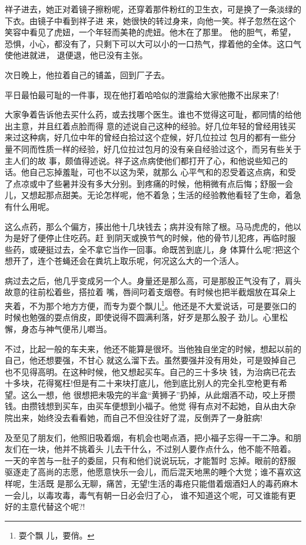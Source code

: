 \documentclass[11pt,a4paper,onecolumn]{article}
\begin{document}
祥子进去，她正对着镜子擦粉呢，还穿着那件粉红的卫生衣，可是换了一条淡绿的下衣。由镜子中看到祥子进
来，她很快的转过身来，向他一笑。祥子忽然在这个笑容中看见了虎妞，一个年轻而美艳的虎妞。他木在了那里。
他的胆气，希望，恐惧，小心，都没有了，只剩下可以大可以小的一口热气，撑着他的全体。这口气使他进就进，
退便退，他已没有主张。

次日晚上，他拉着自己的铺盖，回到厂子去。

平日最怕最可耻的一件事，现在他打着哈哈似的泄露给大家\myrule 他撒不出尿来了!

大家争着告诉他去买什么药，或去找哪个医生。谁也不觉得这可耻，都同情的给他出主意，并且红着点脸而得
意的述说自己这种的经验。好几位年轻的曾经用钱买来过这种病，好几位中年的曾经白拾过这个症候，好几位拉过
包月的都有一些分量不同而性质一样的经验，好几位拉过包月的没有亲自经验过这个，而另有些关于主人们的故
事，颇值得述说。祥子这点病使他们都打开了心，和他说些知己的话。他自己忘掉羞耻，可也不以这为荣，就那么
心平气和的忍受着这点病，和受了点凉或中了些暑并没有多大分别。到疼痛的时候，他稍微有点后悔；舒服一会
儿，又想起那点甜美。无论怎样呢，他不着急；生活的经验教他看轻了生命，着急有什么用呢。

这么点药，那么个偏方，揍出他十几块钱去；病并没有除了根。马马虎虎的，他以为是好了便停止住吃药。赶
到阴天或换节气的时候，他的骨节儿犯疼，再临时服些药，或硬挺过去，全不拿它当作一回事。命既苦到底儿，身
体算什么呢?把这个想开了，连个苍蝇还会在粪坑上取乐呢，何况这么大的一个活人。

病过去之后，他几乎变成另一个人。身量还是那么高，可是那股正气没有了，肩头故意的往前松着些，搭拉着
嘴，唇间叼着支烟卷。有时候也把半截烟放在耳朵上夹着，不为那个地方方便，而专为耍个飘儿\footnote{耍个飘
  儿，要俏。}。他还是不大爱说话，可是要张口的时候也勉强的耍点俏皮，即使说得不圆满利落，好歹是那么股子
劲儿。心里松懈，身态与神气便吊儿啷当。

不过，比起一般的车夫来，他还不能算是很坏。当他独自坐定的时候，想起以前的自己，他还想要强，不甘心
就这么溜下去。虽然要强并没有用处，可是毁掉自己也不见得高明。在这种时候，他又想起买车。自己的三十多块
钱，为治病已花去十多块，花得冤枉!但是有二十来块打底儿，他到底比别人的完全扎空枪更有希望。这么一想，他
很想把未吸完的半盒``黄狮子''扔掉，从此烟酒不动，咬上牙攒钱。由攒钱想到买车，由买车便想到小福子。他觉
得有点对不起她，自从由大杂院出来，始终没去看看她，而自己不但没往好了混，反倒弄了一身脏病!

及至见了朋友们，他照旧吸着烟，有机会也喝点酒，把小福子忘得一干二净。和朋友们在一块，他并不挑着头
儿去干什么，不过别人要作点什么，他不能不陪着。一天的辛苦与一肚子的委屈，只有和他们说说玩玩，才能暂时
忘掉。眼前的舒服驱逐走了高尚的志愿，他愿意快乐一会儿，而后混天地黑的睡个大觉；谁不喜欢这样呢，生活既
是那么无聊，痛苦，无望!生活的毒疮只能借着烟酒妇人的毒药麻木一会儿，以毒攻毒，毒气有朝一日必会归了心，
谁不知道这个呢，可又谁能有更好的主意代替这个呢?!
\end{document}

